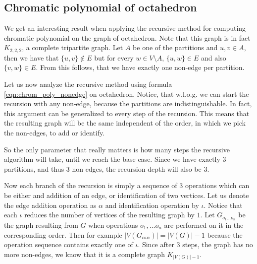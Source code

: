 \begin{highlight}

\subsection{Chromatic polynomial of octahedron}

We get an interesting result when applying the recursive method for computing chromatic polynomial on the graph of octahedron. Note that this graph is in fact $K_{2,2,2}$, a complete tripartite graph. Let $A$ be one of the partitions and $u,v \in A$, then we have that $\{u,v\} \notin E$ but for every $w \in V \setminus A$, $\{u,w\} \in E$ and also $\{v,w\} \in E$. From this follows, that we have exactly one non-edge per partition.

Let us now analyze the recursive method using formula \ref{eqn:chrom_poly_nonedge} on octahedron. Notice, that w.l.o.g. we can start the recursion with any non-edge, because the partitions are indistinguishable. In fact, this argument can be generalized to every step of the recursion. This means that the resulting graph will be the same independent of the order, in which we pick the non-edges, to add or identify.

So the only parameter that really matters is how many steps the recursive algorithm will take, until we reach the base case. Since we have exactly $3$ partitions, and thus $3$ non edges, the recursion depth will also be $3$.

Now each branch of the recursion is simply a sequence of $3$ operations which can be either and addition of an edge, or identification of two vertices. Let us denote the edge addition operation as $\alpha$ and identification operation by $\iota$. Notice that each $\iota$ reduces the number of vertices of the resulting graph by $1$. Let $G_{o_1 \ldots o_n}$ be the graph resulting from $G$ when operations $o_1, \ldots o_n$ are performed on it in the corresponding order. Then for example $|V(G_{\alpha \iota\alpha})| = |V(G)| -1$ because the operation sequence contains exactly one of $\iota$. Since after $3$ steps, the graph has no more non-edges, we know that it is a complete graph $K_{|V(G)|-1}$. 

\end{highlight}